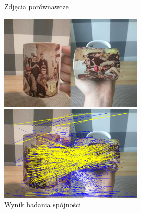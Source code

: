 \documentclass[../main.tex]{subfiles}
\begin{document}
    \begin{figure}[H]
    \centering
    \begin{minipage}{.5\textwidth}
        \caption{Zdjęcia porównawcze}
        \centering
        \includegraphics[width=7cm]{mug_clean_out}
    \end{minipage}%
    \begin{minipage}{.5\textwidth}
        \caption{Wynik badania spójności}
        \centering
        \includegraphics[width=7cm]{mug_pairs_conspairs_out}
    \end{minipage}%
    \end{figure}
\end{document}
